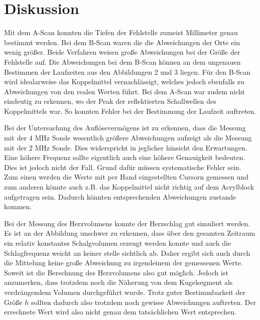 \section{Diskussion}
\label{sec:Diskussion}

Mit dem A-Scan konnten die Tiefen der Fehlstelle zumeist Millimeter genau bestimmt werden. Bei dem
B-Scan waren die die Abweichungen der Orte ein wenig größer. Beide Verfahren weisen große Abweichungen bei der
Größe der Fehlstelle auf. Die Abweichungen bei dem B-Scan können an dem ungenauen Bestimmen der Laufzeiten aus
den Abbildungen 2 und 3 liegen. Für den B-Scan wird idealarweise das Koppelmittel vernachlässigt, welches jedoch
ebenfalls zu Abweichungen von den realen Werten führt.
Bei dem A-Scan war zudem nicht eindeutig zu erkennen, wo der Peak der reflektierten Schallwellen des Koppelmittels war. So konnten
Fehler bei der Bestimmung der Laufzeit auftreten.

Bei der Untersuchung des Auflösevermögens ist zu erkennen, dass die Messung mit der 4 MHz Sonde wesentlich größere Abweichungen aufzeigt
als die Messung mit der 2 MHz Sonde. Dies widerspricht in jeglicher hinsicht den Erwartungen. Eine höhere Frequenz sollte eigentlich auch
eine höhere Genauigkeit bedeuten. Dies ist jedoch nicht der Fall. Grund dafür müssen systematische Fehler sein. Zum einen werden die
Werte mit per Hand eingestellten Cursorn gemessen und zum anderen könnte auch z.B. das Koppelmittel nicht richtig auf dem Acrylblock aufgetragen
sein. Dadurch könnten entsprechenden Abweichungen zustande kommen.

Bei der Messung des Herzvolumens konnte der Herzschlag gut simuliert werden. Es ist an der Abbildung unschwer zu erkennen, dass über den
gesamten Zeitraum ein relativ konstantes Schalgvolumen erzeugt werden konnte und auch die Schlagfrequenz weicht an keiner stelle
sichtlich ab. Daher ergibt sich auch durch die Mittelung keine große Abweichung zu irgendeinem der gemessenen Werte. Soweit ist
die Berechnung des Herzvolumens also gut möglich. Jedoch ist anzumerken, dass trotzdem noch die Näherung von dem Kugelsegment
als verdrängendem Volumen durchgeführt wurde. Trotz guter Bestimmbarkeit der Größe $h$ sollten dadurch also trotzdem noch gewisse Abweichungen
auftreten. Der errechnete Wert wird also nicht genau dem tatsächlichen Wert entsprechen.
